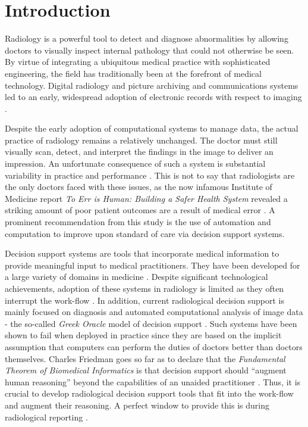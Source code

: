 \chapter{Introduction}
Radiology is a powerful tool to detect and diagnose abnormalities by allowing doctors to visually inspect internal pathology that could not otherwise be seen. By virtue of integrating a ubiquitous medical practice with sophisticated engineering, the field has traditionally been at the forefront of medical technology. Digital radiology and picture archiving and communications systems led to an early, widespread adoption of electronic records with respect to imaging \cite{Strickland:2000cv,Bryan:1999kn}.

Despite the early adoption of computational systems to manage data, the actual practice of radiology remains a relatively unchanged. The doctor must still visually scan, detect, and interpret the findings in the image to deliver an impression. An unfortunate consequence of such a system is substantial variability in practice and performance \cite{Robinson:1997uq,Fitzgerald:2001hn}. This is not to say that radiologists are the only doctors faced with these issues, as the now infamous Institute of Medicine report \emph{To Err is Human: Building a Safer Health System} revealed a striking amount of poor patient outcomes are a result of medical error \cite{Anonymous:2000va}. A prominent recommendation from this study is the use of automation and computation to improve upon standard of care via decision support systems.

Decision support systems are tools that incorporate medical information to provide meaningful input to medical practitioners. They have been developed for a large variety of domains in medicine \cite{Bright:2012ga,Garg:2005cb,Miller:1994cx,Kawamoto:2005gn}. Despite significant technological achievements, adoption of these systems in radiology is limited as they often interrupt the  work-flow \cite{Morgan:2011ct}. In addition, current radiological decision support is mainly focused on diagnosis and automated computational analysis of image data \cite{Garg:2005cb, Burnside:2000wl, ElizabethS:2005gc, Rubin:2005jg} - the so-called \emph{Greek Oracle} model of decision support \cite{Miller:1990wg,Miller:1994cx}. Such systems have been shown to fail when deployed in practice since they are based on the implicit assumption that computers can perform the duties of doctors better than doctors themselves. Charles Friedman goes so far as to declare that the \emph{Fundamental Theorem of Biomedical Informatics} is that decision support should ``augment human reasoning'' beyond the capabilities of an unaided practitioner \cite{Friedman:2009dx}. Thus, it is crucial to develop radiological decision support tools that fit into the work-flow and augment their reasoning. A perfect window to provide this is during radiological reporting \cite{Noumeir:2006cb}.


